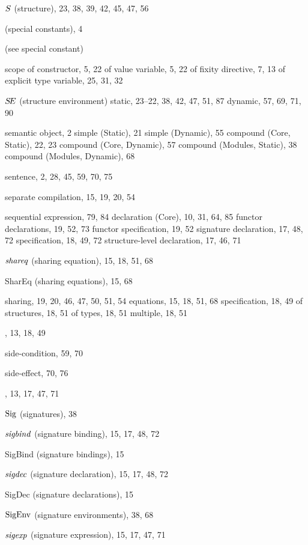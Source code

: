 \begin{theindex}
\item $\S$ (structure), 23, 38, 39, 42, 45, 47, 56
\item {\SCon} (special constants), 4
\item {\scon} (see special constant) 
\item scope 
\subitem of constructor, 5, 22
\subitem of value variable, 5, 22
\subitem of fixity directive, 7, 13
\subitem of explicit type variable, 25, 31, 32
\item $\SE$ (structure environment) 
\subitem static, 23--22, 38, 42, 47, 51, 87
\subitem dynamic, 57, 69, 71, 90
\item semantic object, 2
\subitem simple (Static), 21
\subitem simple (Dynamic), 55
\subitem compound (Core, Static), 22, 23
\subitem compound (Core, Dynamic), 57
\subitem compound (Modules, Static), 38
\subitem compound (Modules, Dynamic), 68
\item sentence, 2, 28, 45, 59, 70, 75
\item separate compilation, 15, 19, 20, 54
\item sequential 
\subitem expression, 79, 84
\subitem declaration (Core), 10, 31, 64, 85
\subitem functor declarations, 19, 52, 73
\subitem functor specification, 19, 52
\subitem signature declaration, 17, 48, 72
\subitem specification, 18, 49, 72
\subitem structure-level declaration, 17, 46, 71
\item $\shareq$ (sharing equation), 15, 18, 51, 68
\item SharEq (sharing equations), 15, 68
\item sharing, 19, 20, 46, 47, 50, 51, 54
\subitem equations, 15, 18, 51, 68
\subitem specification, 18, 49
\subitem of structures, 18, 51
\subitem of types, 18, 51
\subitem multiple, 18, 51
\item \SHARING, 13, 18, 49
\item side-condition, 59, 70
\item side-effect, 70, 76
\item \SIG, 13, 17, 47, 71
\item $\Sig$ (signatures), 38
\item $\sigbind$ (signature binding), 15, 17, 48, 72
\item SigBind (signature bindings), 15
\item $\sigdec$ (signature declaration), 15, 17, 48, 72
\item SigDec (signature declarations), 15
\item $\SigEnv$ (signature environments), 38, 68
\item $\sigexp$ (signature expression), 15, 17, 47, 71

\end{theindex}
